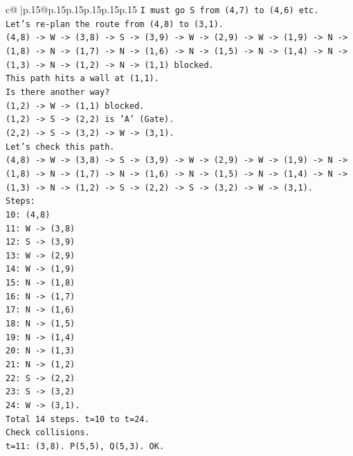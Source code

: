 \documentclass{article}
\begin{document}
{\begin{supertabular}{c@{$\;$}|p{.15\linewidth}@{}p{.15\linewidth}p{.15\linewidth}p{.15\linewidth}p{.15\linewidth}p{.15\linewidth}}
{{{\texttt{I must go S from (4,7) to (4,6) etc.} \\
\texttt{Let's re{-}plan the route from (4,8) to (3,1).} \\
\texttt{(4,8) {-}> W {-}> (3,8) {-}> S {-}> (3,9) {-}> W {-}> (2,9) {-}> W {-}> (1,9) {-}> N {-}> (1,8) {-}> N {-}> (1,7) {-}> N {-}> (1,6) {-}> N {-}> (1,5) {-}> N {-}> (1,4) {-}> N {-}> (1,3) {-}> N {-}> (1,2) {-}> N {-}> (1,1) blocked.} \\
\texttt{This path hits a wall at (1,1).} \\
\texttt{Is there another way?} \\
\texttt{(1,2) {-}> W {-}> (1,1) blocked.} \\
\texttt{(1,2) {-}> S {-}> (2,2) is 'A' (Gate).} \\
\texttt{(2,2) {-}> S {-}> (3,2) {-}> W {-}> (3,1).} \\
\texttt{Let's check this path.} \\
\texttt{(4,8) {-}> W {-}> (3,8) {-}> S {-}> (3,9) {-}> W {-}> (2,9) {-}> W {-}> (1,9) {-}> N {-}> (1,8) {-}> N {-}> (1,7) {-}> N {-}> (1,6) {-}> N {-}> (1,5) {-}> N {-}> (1,4) {-}> N {-}> (1,3) {-}> N {-}> (1,2) {-}> S {-}> (2,2) {-}> S {-}> (3,2) {-}> W {-}> (3,1).} \\
\texttt{Steps:} \\
\texttt{10: (4,8)} \\
\texttt{11: W {-}> (3,8)} \\
\texttt{12: S {-}> (3,9)} \\
\texttt{13: W {-}> (2,9)} \\
\texttt{14: W {-}> (1,9)} \\
\texttt{15: N {-}> (1,8)} \\
\texttt{16: N {-}> (1,7)} \\
\texttt{17: N {-}> (1,6)} \\
\texttt{18: N {-}> (1,5)} \\
\texttt{19: N {-}> (1,4)} \\
\texttt{20: N {-}> (1,3)} \\
\texttt{21: N {-}> (1,2)} \\
\texttt{22: S {-}> (2,2)} \\
\texttt{23: S {-}> (3,2)} \\
\texttt{24: W {-}> (3,1).} \\
\texttt{Total 14 steps. t=10 to t=24.} \\
\texttt{Check collisions.} \\
\texttt{t=11: (3,8). P(5,5), Q(5,3). OK.} \\
}}}
\end{supertabular}}
\end{document}
